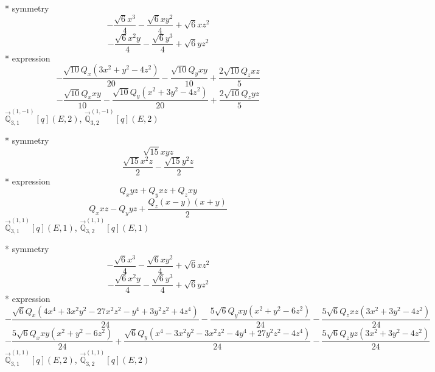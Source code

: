 \documentclass[fleqn,8pt]{jsarticle}
\begin{document}
\noindent\quad ** symmetry
\begin{dmath*}
- \frac{\sqrt{6} x^{3}}{4} - \frac{\sqrt{6} x y^{2}}{4} + \sqrt{6} x z^{2}
\end{dmath*}
\begin{dmath*}
- \frac{\sqrt{6} x^{2} y}{4} - \frac{\sqrt{6} y^{3}}{4} + \sqrt{6} y z^{2}
\end{dmath*}
\noindent\quad ** expression
\begin{dmath*}
- \frac{\sqrt{10} Q_{x} \left(3 x^{2} + y^{2} - 4 z^{2}\right)}{20} - \frac{\sqrt{10} Q_{y} x y}{10} + \frac{2 \sqrt{10} Q_{z} x z}{5}
\end{dmath*}
\begin{dmath*}
- \frac{\sqrt{10} Q_{x} x y}{10} - \frac{\sqrt{10} Q_{y} \left(x^{2} + 3 y^{2} - 4 z^{2}\right)}{20} + \frac{2 \sqrt{10} Q_{z} y z}{5}
\end{dmath*}
\noindent\quad $\vec{\mathbb{Q}}_{3,1}^{(1,-1)}[q](E,2)$, $\vec{\mathbb{Q}}_{3,2}^{(1,-1)}[q](E,2)$

\noindent\quad ** symmetry
\begin{dmath*}
\sqrt{15} x y z
\end{dmath*}
\begin{dmath*}
\frac{\sqrt{15} x^{2} z}{2} - \frac{\sqrt{15} y^{2} z}{2}
\end{dmath*}
\noindent\quad ** expression
\begin{dmath*}
Q_{x} y z + Q_{y} x z + Q_{z} x y
\end{dmath*}
\begin{dmath*}
Q_{x} x z - Q_{y} y z + \frac{Q_{z} \left(x - y\right) \left(x + y\right)}{2}
\end{dmath*}
\noindent\quad $\vec{\mathbb{Q}}_{3,1}^{(1,1)}[q](E,1)$, $\vec{\mathbb{Q}}_{3,2}^{(1,1)}[q](E,1)$

\noindent\quad ** symmetry
\begin{dmath*}
- \frac{\sqrt{6} x^{3}}{4} - \frac{\sqrt{6} x y^{2}}{4} + \sqrt{6} x z^{2}
\end{dmath*}
\begin{dmath*}
- \frac{\sqrt{6} x^{2} y}{4} - \frac{\sqrt{6} y^{3}}{4} + \sqrt{6} y z^{2}
\end{dmath*}
\noindent\quad ** expression
\begin{dmath*}
- \frac{\sqrt{6} Q_{x} \left(4 x^{4} + 3 x^{2} y^{2} - 27 x^{2} z^{2} - y^{4} + 3 y^{2} z^{2} + 4 z^{4}\right)}{24} - \frac{5 \sqrt{6} Q_{y} x y \left(x^{2} + y^{2} - 6 z^{2}\right)}{24} - \frac{5 \sqrt{6} Q_{z} x z \left(3 x^{2} + 3 y^{2} - 4 z^{2}\right)}{24}
\end{dmath*}
\begin{dmath*}
- \frac{5 \sqrt{6} Q_{x} x y \left(x^{2} + y^{2} - 6 z^{2}\right)}{24} + \frac{\sqrt{6} Q_{y} \left(x^{4} - 3 x^{2} y^{2} - 3 x^{2} z^{2} - 4 y^{4} + 27 y^{2} z^{2} - 4 z^{4}\right)}{24} - \frac{5 \sqrt{6} Q_{z} y z \left(3 x^{2} + 3 y^{2} - 4 z^{2}\right)}{24}
\end{dmath*}
\noindent\quad $\vec{\mathbb{Q}}_{3,1}^{(1,1)}[q](E,2)$, $\vec{\mathbb{Q}}_{3,2}^{(1,1)}[q](E,2)$
\end{document}

